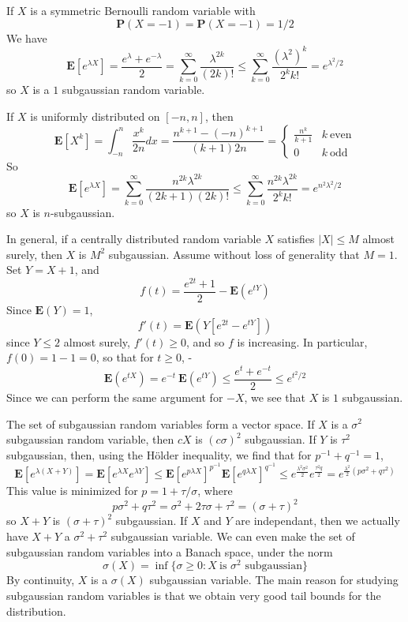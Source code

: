 \begin{example}
    If $X$ is a symmetric Bernoulli random variable with
    \[ \mathbf{P}(X = -1) = \mathbf{P}(X = -1) = 1/2 \]
    We have
    \[ \mathbf{E}[e^{\lambda X}] = \frac{e^\lambda + e^{-\lambda}}{2} = \sum_{k = 0}^\infty \frac{\lambda^{2k}}{(2k)!} \leq \sum_{k = 0}^\infty \frac{(\lambda^2)^k}{2^k k!} = e^{\lambda^2/2} \]
    so $X$ is a $1$ subgaussian random variable.
\end{example}

\begin{example}
    If $X$ is uniformly distributed on $[-n,n]$, then
    \[ \mathbf{E}[X^k] = \int_{-n}^n \frac{x^k}{2n} dx = \frac{n^{k+1} - (-n)^{k+1}}{(k+1)2n} = \begin{cases} \frac{n^k}{k+1} & k\ \text{even} \\ 0 & k\ \text{odd} \end{cases} \]
    So
    \[ \mathbf{E}[e^{\lambda X}] = \sum_{k = 0}^\infty \frac{n^{2k} \lambda^{2k}}{(2k+1)(2k)!} \leq \sum_{k = 0}^\infty \frac{n^{2k} \lambda^{2k}}{2^k k!} = e^{n^2\lambda^2/2} \]
    so $X$ is $n$-subgaussian.
\end{example}

\begin{example}
    In general, if a centrally distributed random variable $X$ satisfies $|X| \leq M$ almost surely, then $X$ is $M^2$ subgaussian. Assume without loss of generality that $M = 1$. Set $Y = X+1$, and
    \[ f(t) = \frac{e^{2t} + 1}{2} - \mathbf{E}(e^{tY}) \]
    Since $\mathbf{E}(Y) = 1$,
    \[ f'(t) = \mathbf{E}(Y[e^{2t} - e^{tY}]) \]
    since $Y \leq 2$ almost surely, $f'(t) \geq 0$, and so $f$ is increasing. In particular, $f(0) = 1 - 1 = 0$, so that for $t \geq 0$,
-    %
    \[ \mathbf{E}(e^{tX}) = e^{-t}\ \mathbf{E}(e^{tY}) \leq \frac{e^{t} + e^{-t}}{2} \leq e^{t^2/2} \]
    Since we can perform the same argument for $-X$, we see that $X$ is $1$ subgaussian.
\end{example}

The set of subgaussian random variables form a vector space. If $X$ is a $\sigma^2$ subgaussian random variable, then $cX$ is $(c\sigma)^2$ subgaussian. If $Y$ is $\tau^2$ subgaussian, then, using the H\"{o}lder inequality, we find that for $p^{-1} + q^{-1} = 1$,
%
\[ \mathbf{E}[e^{\lambda(X+Y)}] = \mathbf{E}[e^{\lambda X} e^{\lambda Y}] \leq \mathbf{E}[e^{p \lambda X}]^{p^{-1}} \mathbf{E}[e^{q \lambda X}]^{q^{-1}} \leq e^{\frac{\lambda^2 \sigma^2}{2}} e^{\frac{\tau^2 q}{2}} = e^{\frac{\lambda^2}{2}(p \sigma^2 + q \tau^2)} \]
%
This value is minimized for $p = 1 + \tau/\sigma$, where
%
\[ p \sigma^2 + q \tau^2 = \sigma^2 + 2 \tau \sigma + \tau^2 = (\sigma + \tau)^2 \]
%
so $X + Y$ is $(\sigma + \tau)^2$ subgaussian. If $X$ and $Y$ are independant, then we actually have $X+Y$ a $\sigma^2 + \tau^2$ subgaussian variable. We can even make the set of subgaussian random variables into a Banach space, under the norm
%
\[ \sigma(X) = \inf \{ \sigma \geq 0 : X\ \text{is $\sigma^2$ subgaussian} \} \]
%
By continuity, $X$ is a $\sigma(X)$ subgaussian variable. The main reason for studying subgaussian random variables is that we obtain very good tail bounds for the distribution.

